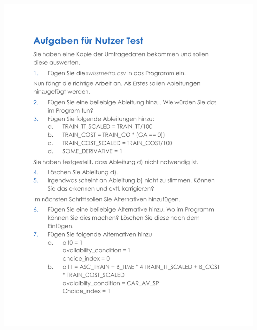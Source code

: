 \documentclass{article}
\begin{document}
\includegraphics[page = 2, width=1\textwidth,height=1\textheight]{ressources/aufgaben.pdf}
\end{document}
